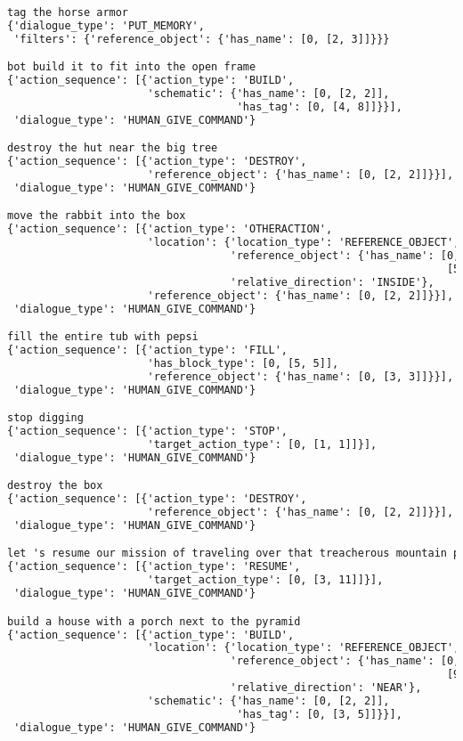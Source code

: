 \begin{lstlisting}[language=TeX]
tag the horse armor
{'dialogue_type': 'PUT_MEMORY',
 'filters': {'reference_object': {'has_name': [0, [2, 3]]}}}

bot build it to fit into the open frame
{'action_sequence': [{'action_type': 'BUILD',
                      'schematic': {'has_name': [0, [2, 2]],
                                    'has_tag': [0, [4, 8]]}}],
 'dialogue_type': 'HUMAN_GIVE_COMMAND'}

destroy the hut near the big tree
{'action_sequence': [{'action_type': 'DESTROY',
                      'reference_object': {'has_name': [0, [2, 2]]}}],
 'dialogue_type': 'HUMAN_GIVE_COMMAND'}

move the rabbit into the box
{'action_sequence': [{'action_type': 'OTHERACTION',
                      'location': {'location_type': 'REFERENCE_OBJECT',
                                   'reference_object': {'has_name': [0,
                                                                     [5, 5]]},
                                   'relative_direction': 'INSIDE'},
                      'reference_object': {'has_name': [0, [2, 2]]}}],
 'dialogue_type': 'HUMAN_GIVE_COMMAND'}

fill the entire tub with pepsi
{'action_sequence': [{'action_type': 'FILL',
                      'has_block_type': [0, [5, 5]],
                      'reference_object': {'has_name': [0, [3, 3]]}}],
 'dialogue_type': 'HUMAN_GIVE_COMMAND'}

stop digging
{'action_sequence': [{'action_type': 'STOP',
                      'target_action_type': [0, [1, 1]]}],
 'dialogue_type': 'HUMAN_GIVE_COMMAND'}

destroy the box
{'action_sequence': [{'action_type': 'DESTROY',
                      'reference_object': {'has_name': [0, [2, 2]]}}],
 'dialogue_type': 'HUMAN_GIVE_COMMAND'}

let 's resume our mission of traveling over that treacherous mountain pass
{'action_sequence': [{'action_type': 'RESUME',
                      'target_action_type': [0, [3, 11]]}],
 'dialogue_type': 'HUMAN_GIVE_COMMAND'}

build a house with a porch next to the pyramid
{'action_sequence': [{'action_type': 'BUILD',
                      'location': {'location_type': 'REFERENCE_OBJECT',
                                   'reference_object': {'has_name': [0,
                                                                     [9, 9]]},
                                   'relative_direction': 'NEAR'},
                      'schematic': {'has_name': [0, [2, 2]],
                                    'has_tag': [0, [3, 5]]}}],
 'dialogue_type': 'HUMAN_GIVE_COMMAND'}


\end{lstlisting}
